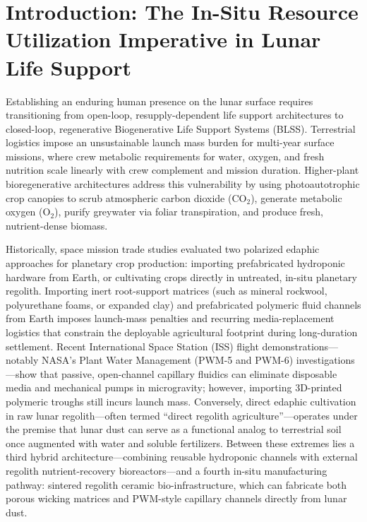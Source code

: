 \section{Introduction: The In-Situ Resource Utilization Imperative in Lunar Life Support}
\label{sec:introduction}

Establishing an enduring human presence on the lunar surface requires transitioning from open-loop, resupply-dependent life support architectures to closed-loop, regenerative Biogenerative Life Support Systems (BLSS)\cite{wheeler2017agriculture,paul2022plants,ming1989lunar}. Terrestrial logistics impose an unsustainable launch mass burden for multi-year surface missions, where crew metabolic requirements for water, oxygen, and fresh nutrition scale linearly with crew complement and mission duration\cite{hanford2004advanced,wheeler2003carbon}. Higher-plant bioregenerative architectures address this vulnerability by using photoautotrophic crop canopies to scrub atmospheric carbon dioxide ($\mathrm{CO}_2$), generate metabolic oxygen ($\mathrm{O}_2$), purify greywater via foliar transpiration, and produce fresh, nutrient-dense biomass\cite{wheeler2017agriculture,ming1989lunar,wheeler2003carbon}.

Historically, space mission trade studies evaluated two polarized edaphic approaches for planetary crop production: importing prefabricated hydroponic hardware from Earth, or cultivating crops directly in untreated, in-situ planetary regolith\cite{paul2022plants,ming1989lunar,wamelink2019crop}. Importing inert root-support matrices (such as mineral rockwool, polyurethane foams, or expanded clay) and prefabricated polymeric fluid channels from Earth imposes launch-mass penalties and recurring media-replacement logistics that constrain the deployable agricultural footprint during long-duration settlement\cite{ming1989lunar,hanford2004advanced,wamelink2019crop}. Recent International Space Station (ISS) flight demonstrations---notably NASA's Plant Water Management (PWM-5 and PWM-6) investigations---show that passive, open-channel capillary fluidics can eliminate disposable media and mechanical pumps in microgravity\cite{nasa_pwm,weislogel2026pwm,monje2026hydroponic}; however, importing 3D-printed polymeric troughs still incurs launch mass. Conversely, direct edaphic cultivation in raw lunar regolith---often termed ``direct regolith agriculture''---operates under the premise that lunar dust can serve as a functional analog to terrestrial soil once augmented with water and soluble fertilizers\cite{ming1989lunar,wamelink2019crop,atkin2024bioremediation}. Between these extremes lies a third hybrid architecture---combining reusable hydroponic channels with external regolith nutrient-recovery bioreactors---and a fourth in-situ manufacturing pathway: sintered regolith ceramic bio-infrastructure, which can fabricate both porous wicking matrices and PWM-style capillary channels directly from lunar dust.

